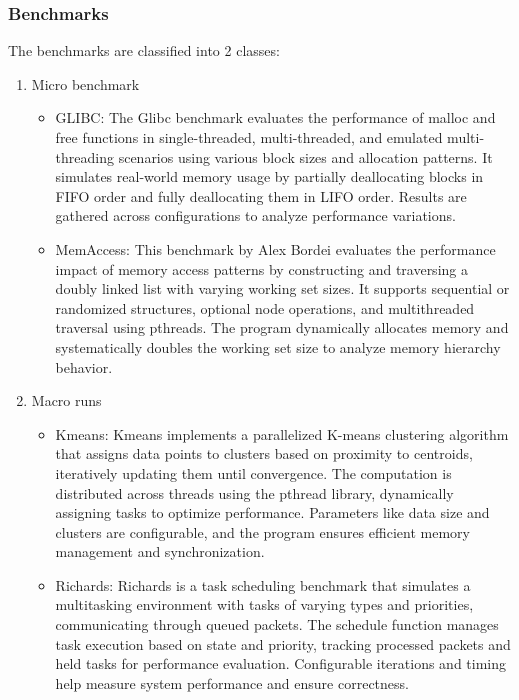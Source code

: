 \documentclass[11pt]{article}
\begin{document}
\subsubsection{Benchmarks}
\label{sec:orgddacffd}
The benchmarks are classified into 2 classes:

\begin{enumerate}
\item Micro benchmark
\label{sec:orgb329a4e}
\begin{itemize}
\item GLIBC: The Glibc benchmark evaluates the performance of
malloc and free functions in single-threaded, multi-threaded,
and emulated multi-threading scenarios using various block sizes and
allocation patterns. It simulates real-world memory usage by partially
deallocating blocks in FIFO order and fully deallocating them in LIFO order.
Results are gathered across configurations to analyze performance variations.
\item MemAccess: This benchmark by Alex Bordei evaluates the performance impact of
memory access patterns by constructing and traversing a doubly
linked list with varying working set sizes. It supports sequential or
randomized structures, optional node operations, and multithreaded
traversal using pthreads. The program dynamically allocates memory and systematically
doubles the working set size to analyze memory hierarchy behavior.
\end{itemize}

\item Macro runs
\label{sec:orga786fd0}
\begin{itemize}
\item Kmeans: Kmeans implements a parallelized K-means clustering algorithm that
assigns data points to clusters based on proximity to centroids,
iteratively updating them until convergence. The computation is
distributed across threads using the pthread library, dynamically
assigning tasks to optimize performance. Parameters like data size
and clusters are configurable, and the program ensures efficient
memory management and synchronization.
\item Richards: Richards is a task scheduling benchmark that simulates a
multitasking environment with tasks of varying types and priorities,
communicating through queued packets. The schedule function manages
task execution based on state and priority, tracking processed packets
and held tasks for performance evaluation. Configurable iterations and
timing help measure system performance and ensure correctness.
\end{itemize}
\end{enumerate}
\end{document}
